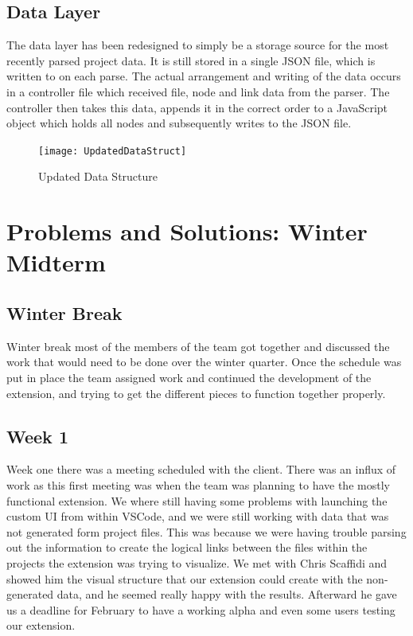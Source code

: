 \documentclass[letterpaper,10pt,titlepage,draftclsnofoot,onecolumn,onesided] {IEEEtran}
\begin{document}
	\subsection{Data Layer}
	The data layer has been redesigned to simply be a storage source for the most recently parsed project data.
	It is still stored in a single JSON file, which is written to on each parse.
	The actual arrangement and writing of the data occurs in a controller file which received file, node and link data from the parser.
	The controller then takes this data, appends it in the correct order to a JavaScript object which holds all nodes and subsequently writes to the JSON file.
	\begin{figure}
		\texttt{[image: UpdatedDataStruct]}
		\caption{Updated Data Structure}
	\end{figure}

\section{Problems and Solutions: Winter Midterm }
	\subsection{Winter Break}
	Winter break most of the members of the team got together and discussed the work that would need to be done over the winter quarter.
	Once the schedule was put in place the team assigned work and continued the development of the extension, and trying to get the different pieces to function together properly. 
	
	\subsection{Week 1}
	Week one there was a meeting scheduled with the client. 
	There was an influx of work as this first meeting was when the team was planning to have the mostly functional extension. 
	We where still having some problems with launching the custom UI from within VSCode, and we were still working with data that was not generated form project files.
	This was because we were having trouble parsing out the information to create the logical links between the files within the projects the extension was trying to visualize. 
	We met with Chris Scaffidi and showed him the visual structure that our extension could create with the non-generated data, and he seemed really happy with the results.
	Afterward he gave us a deadline for February to have a working alpha and even some users testing our extension. 
	
\end{document}
